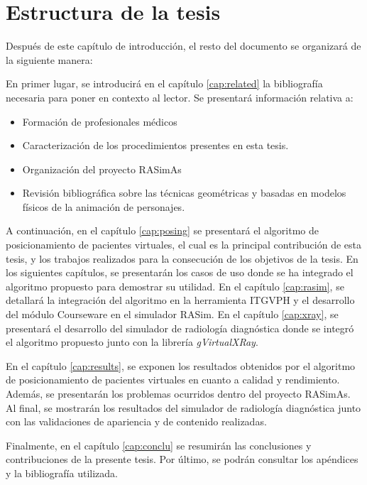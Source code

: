 \clearpage
\section{Estructura de la tesis}

Después de este capítulo de introducción, el resto del documento se organizará de la siguiente manera:

En primer lugar, se introducirá en el capítulo \ref{cap:related} la bibliografía necesaria para poner en contexto al lector. Se presentará información relativa a:
\begin{itemize}
    \item Formación de profesionales médicos
    \item Caracterización de los procedimientos presentes en esta tesis.
    \item Organización del proyecto \acs{RASimAs}
    \item Revisión bibliográfica sobre las técnicas geométricas y basadas en modelos físicos de la animación de personajes.
\end{itemize}

A continuación, en el capítulo \ref{cap:posing} se presentará el algoritmo de posicionamiento de pacientes virtuales, el cual es la principal contribución de esta tesis, y los trabajos realizados para la consecución de los objetivos de la tesis. En los siguientes capítulos, se presentarán los casos de uso donde se ha integrado el algoritmo propuesto para demostrar su utilidad. En el capítulo \ref{cap:rasim}, se detallará la integración del algoritmo en la herramienta \acs{ITGVPH} y el desarrollo del módulo \acs{Courseware} en el simulador \acs{RASim}. En el capítulo \ref{cap:xray}, se presentará el desarrollo del simulador de radiología diagnóstica donde se integró el algoritmo propuesto junto con la librería \emph{gVirtualXRay}.

En el capítulo \ref{cap:results}, se exponen los resultados obtenidos por el algoritmo de posicionamiento de pacientes virtuales en cuanto a calidad y rendimiento. Además, se presentarán los problemas ocurridos dentro del proyecto \ac{RASimAs}. Al final, se mostrarán los resultados del simulador de radiología diagnóstica junto con las  validaciones de apariencia y de contenido realizadas. 

Finalmente, en el capítulo \ref{cap:conclu} se resumirán las conclusiones y contribuciones de la presente tesis. Por último, se podrán consultar los apéndices y la bibliografía utilizada.